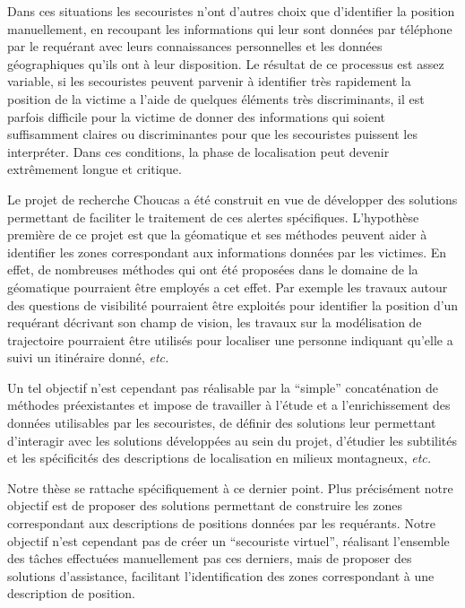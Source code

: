 Dans ces situations les secouristes n'ont d'autres choix que
d'identifier la position manuellement, en recoupant les informations
qui leur sont données par téléphone par le requérant avec leurs
connaissances personnelles et les données géographiques qu'ils ont à
leur disposition. Le résultat de ce processus est assez variable, si
les secouristes peuvent parvenir à identifier très rapidement la
position de la victime a l'aide de quelques éléments très
discriminants, il est parfois difficile pour la victime de donner des
informations qui soient suffisamment claires ou discriminantes pour
que les secouristes puissent les interpréter. Dans ces conditions, la
phase de localisation peut devenir extrêmement longue et critique.

Le projet de recherche Choucas a été construit en vue de développer
des solutions permettant de faciliter le traitement de ces alertes
spécifiques. L'hypothèse première de ce projet est que la géomatique
et ses méthodes peuvent aider à identifier les zones correspondant aux
informations données par les victimes. En effet, de nombreuses
méthodes qui ont été proposées dans le domaine de la géomatique
pourraient être employés a cet effet. Par exemple les travaux autour
des questions de visibilité pourraient être exploités pour identifier
la position d'un requérant décrivant son champ de vision, les travaux
sur la modélisation de trajectoire pourraient être utilisés pour
localiser une personne indiquant qu'elle a suivi un itinéraire donné,
\emph{etc.}

Un tel objectif n'est cependant pas réalisable par la \enquote{simple}
concaténation de méthodes préexistantes et impose de travailler à
l'étude et a l’enrichissement des données utilisables par les
secouristes, de définir des solutions leur permettant d’interagir avec
les solutions développées au sein du projet, d'étudier les subtilités
et les spécificités des descriptions de localisation en milieux
montagneux, \emph{etc.} 

Notre thèse se rattache spécifiquement à ce dernier point. Plus
précisément notre objectif est de proposer des solutions permettant de
construire les zones correspondant aux descriptions de positions
données par les requérants. Notre objectif n'est cependant pas de
créer un \enquote{secouriste virtuel}, réalisant l'ensemble des tâches
effectuées manuellement pas ces derniers, mais de proposer des
solutions d'assistance, facilitant l'identification des zones
correspondant à une description de position.

